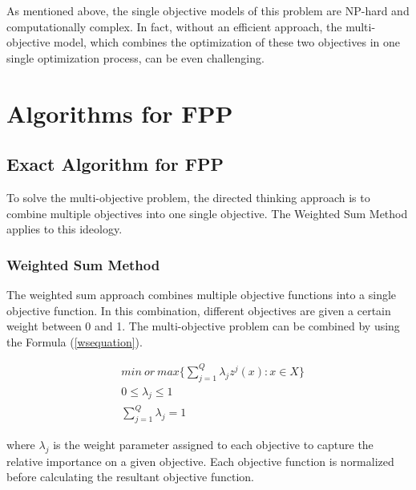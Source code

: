 \documentclass[10pt,journal,compsoc]{IEEEtran}
\newcommand{\Eq}[1]{(\ref{#1})}
\begin{document}

As mentioned above, the single objective models of this problem are NP-hard and computationally complex. In fact, without an efficient approach, the multi-objective model, which combines the optimization of these two objectives in one single optimization process, can be even challenging.

\section{Algorithms for FPP}\label{alfpp}

\subsection{Exact Algorithm for FPP}
To solve the multi-objective problem, the directed thinking approach is to combine multiple objectives into one single objective. The Weighted Sum Method applies to this ideology.

\subsubsection{Weighted Sum Method}
The weighted sum approach combines multiple objective functions into a single objective function. In this combination, different objectives are given a certain weight between 0 and 1. The multi-objective problem can be combined by using the Formula \Eq{wsequation}.

\begin{align}
&min\ or\ max \bigg\{\sum_{j=1}^Q \lambda_j z^j (x) : x \in X \bigg\}\label{wsequation}\\
&0\leq \lambda_j \leq 1\\
&\sum_{j=1}^Q \lambda_j = 1
\end{align}

where $\lambda_j$ is the weight parameter assigned to each objective to capture the relative importance on a given objective. Each objective function is normalized before calculating the resultant objective function. %
\end{document}
